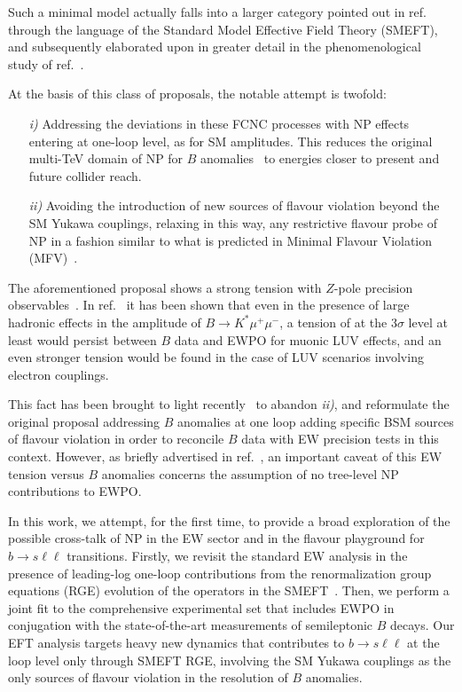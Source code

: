 Such a minimal model actually falls into a larger category pointed out in ref.~\cite{Celis:2017doq} through the language of the Standard Model Effective Field Theory (SMEFT), and subsequently elaborated upon in greater detail in the phenomenological study of ref.~\cite{Camargo-Molina:2018cwu}. 

At the basis of this class of proposals, the notable attempt is twofold: 
\begin{itemize}
	\item[\textit{i)}] Addressing the deviations in these FCNC processes with NP effects entering at one-loop level, as for SM amplitudes. This reduces the original multi-TeV domain of NP for $B$ anomalies~\cite{DiLuzio:2017chi} to energies closer to present and future collider reach.
	\item[\textit{ii)}] Avoiding the introduction of new sources of flavour violation beyond the SM Yukawa couplings, relaxing in this way, any restrictive flavour probe of NP {in a fashion similar to what is predicted in Minimal Flavour Violation (MFV)~\cite{Buras:2000dm,DAmbrosio:2002vsn,Kagan:2009bn}.}
\end{itemize}

The aforementioned proposal shows a strong tension with $Z$-pole precision observables~\cite{Camargo-Molina:2018cwu,Efrati:2015eaa}. In ref.~\cite{Ciuchini:2019usw} it has been shown that even in the presence of large hadronic effects in the amplitude of $B \to K^{*} \mu^{+} \mu^{-}$, a tension of at the 3$\sigma$ level at least would persist between $B$ data and EWPO for muonic LUV effects, and an even stronger tension would be found in the case of LUV scenarios involving electron couplings.

This fact has been brought to light recently~\cite{Coy:2019rfr} to abandon \textit{ii)}, and reformulate the original proposal addressing $B$ anomalies at one loop adding specific {BSM sources of flavour violation in order to reconcile $B$ data with EW precision tests in this context.} However, as briefly advertised in ref.~\cite{Ciuchini:2019usw}, an important caveat of this EW tension versus $B$ anomalies concerns the assumption of no tree-level NP contributions to EWPO. 

In this work, we attempt, for the first time, to provide a broad exploration of the possible cross-talk of NP in the EW sector and in the flavour playground for  $b \to s \ell \ell$ transitions. Firstly, we revisit the standard EW analysis in the presence of leading-log one-loop contributions from the renormalization group equations (RGE) evolution of the operators in the SMEFT~\cite{Jenkins:2013zja,Jenkins:2013wua}. Then, we perform a joint fit to the comprehensive experimental set that includes EWPO in conjugation with the state-of-the-art measurements of semileptonic $B$ decays. Our EFT analysis targets heavy new dynamics that contributes to $b \to s \ell \ell$ at the loop level only through SMEFT RGE, involving the SM Yukawa couplings as the only sources of flavour violation in the resolution of $B$ anomalies.

